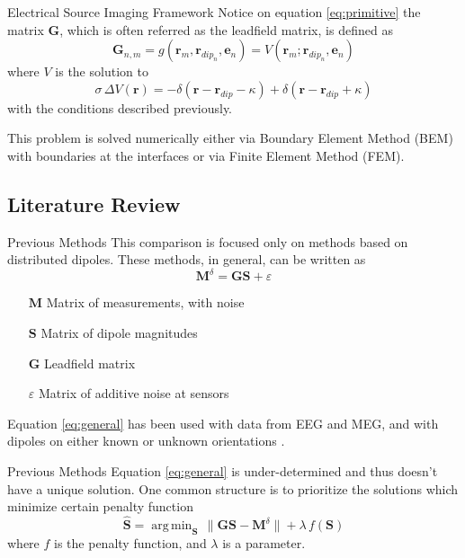 \documentclass[progressbar=head]{beamer}
\newcommand{\ppar}[1]{ \left( #1 \right) }
\DeclareMathOperator*{\argmin}{arg\,min}
\newcommand{\nnorm}[1]{\lVert #1 \rVert}
\newcommand{\G}{\mathbf{G}}
\newcommand{\rr}{\mathbf{r}}
\begin{document}
\begin{frame}{Electrical Source Imaging Framework}
Notice on equation \eqref{eq:primitive} the matrix $\G$, which is often referred as the \alert{leadfield matrix}, is defined as
\begin{equation*}
    \mathbf{G}_{n,m} =
    g\ppar{\rr_m, \rr_{dip_{n}}, \mathbf{e}_{n}} =
    V\ppar{\rr_m; \rr_{dip_{n}}, \mathbf{e}_{n}}
\end{equation*}
where $V$ is the solution to 
\begin{equation}
\sigma\,
\Delta V(\rr)
= 
-\delta\ppar{\rr-\rr_{dip}-\kappa} + \delta\ppar{\rr-\rr_{dip}+\kappa}
\end{equation}
with the conditions described previously.

This problem is solved numerically either via Boundary Element Method (BEM) with boundaries at the interfaces or via Finite Element Method (FEM).
\end{frame}

{
\subsection{Literature Review}
}

\begin{frame}{Previous Methods}
This comparison is focused only on methods based on distributed dipoles. These methods, in general, can be written as
\begin{equation}
    \mathbf{M}^\delta = \mathbf{G} \mathbf{S} + \varepsilon
    \label{eq:general}
\end{equation}
\begin{itemize}
    \item[$\mathbf{M}$] Matrix of measurements, with noise
    \item[$\mathbf{S}$] Matrix of dipole magnitudes
    \item[$\mathbf{G}$] Leadfield matrix
    \item[$\varepsilon$] Matrix of additive noise at sensors
\end{itemize}

Equation \eqref{eq:general} has been used with %
data from EEG and MEG, and with 
dipoles on either known or unknown orientations
\cite{grech2008review}.

\end{frame}

\begin{frame}{Previous Methods}
Equation \eqref{eq:general} is under-determined and thus doesn't have a unique solution. One common structure is to prioritize the solutions which minimize certain penalty function
\begin{equation}
    \hat{\mathbf{S}} = \argmin_{\mathbf{S}}\, \nnorm{\G \mathbf{S}-\mathbf{M}^\delta} + \lambda\, f\ppar{\mathbf{S}}
    \label{eq:general_min}
\end{equation}
where $f$ is the penalty function, and $\lambda$ is a parameter.

\end{frame}
\end{document}
